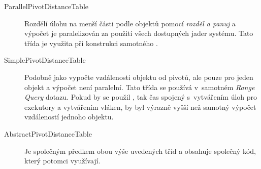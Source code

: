 \begin{description}
\item[ParallelPivotDistanceTable] Rozdělí úlohu na menší části podle objektů pomocí \emph{rozděl a panuj} a výpočet je paralelizován za použití všech dostupných jader systému. Tato třída je využita při konstrukci samotného \MIndex{}.
\item[SimplePivotDistanceTable] Podobně jako  vypočte vzdálenosti objektu od pivotů, ale pouze pro jeden objekt a výpočet není paralelní. Tato třída se používá v~samotném \emph{Range Query} dotazu. Pokud by se použil , tak čas spojený s~vytvářením úloh pro exekutory a vytvářením vláken, by byl výrazně vyšší než samotný výpočet vzdáleností jednoho objektu.
\item[AbstractPivotDistanceTable] Je společným předkem obou výše uvedených tříd a obsahuje společný kód, který potomci využívají.
\end{description}

